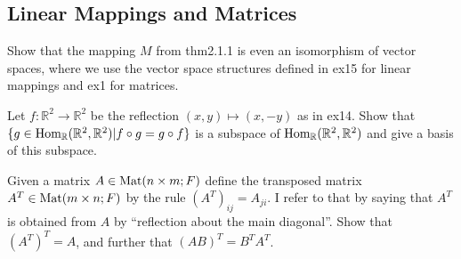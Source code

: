 \subsection{Linear Mappings and Matrices}
\item Show that the mapping $M$ from thm2.1.1 is even an isomorphism of vector spaces, where we use the vector space structures defined in ex15 for linear mappings and ex1 for matrices.
\item Let $f : \mathbb{R}^{2} \to \mathbb{R}^{2}$ be the reflection $(x, y) \mapsto (x, -y)$ as in ex14. Show that $\{g \in \text{Hom}_{\mathbb{R}}(\mathbb{R}^{2}, \mathbb{R}^{2}) | f \circ g = g \circ f\}$ is a subspace of $\text{Hom}_{\mathbb{R}}(\mathbb{R}^{2}, \mathbb{R}^{2})$  and give a basis of this subspace.
\item Given a matrix $A \in \text{Mat}(n \times m; F)$ define the transposed matrix $A^{T} \in \text{Mat}(m \times n; F)$ by the rule $(A^{T})_{ij} = A_{ji}$. I refer to that by saying that $A^{T}$ is obtained from $A$ by ``reflection about the main diagonal''. Show that $(A^{T})^{T} = A$, and further that $(AB)^{T} = B^{T} A^{T}$.
